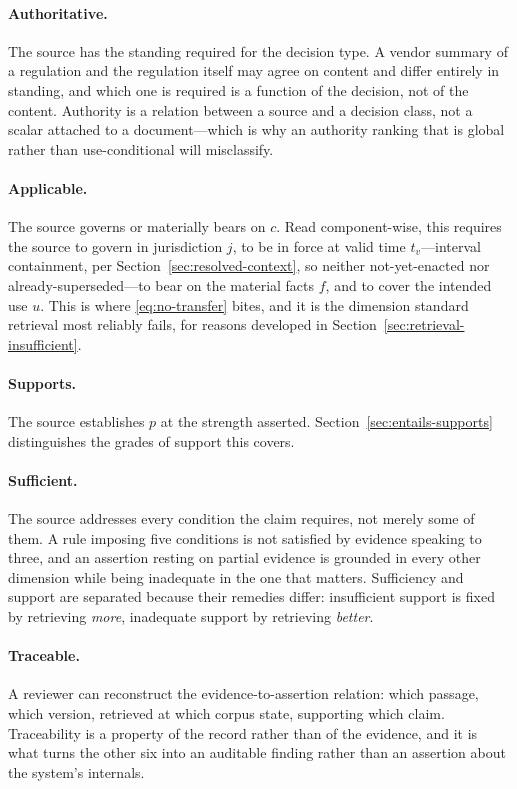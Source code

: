 \paragraph{Authoritative.} The source has the standing required for the decision
type. A vendor summary of a regulation and the regulation itself may agree on
content and differ entirely in standing, and which one is required is a function of
the decision, not of the content. Authority is a relation between a source and a
decision class, not a scalar attached to a document---which is why an authority
ranking that is global rather than use-conditional will misclassify.

\paragraph{Applicable.} The source governs or materially bears on $c$. Read
component-wise, this requires the source to govern in jurisdiction $j$, to be in force
at valid time $t_v$---interval containment, per
Section~\ref{sec:resolved-context}, so neither not-yet-enacted nor
already-superseded---to bear on the material facts $f$, and to cover the intended use
$u$. This is where \eqref{eq:no-transfer} bites, and it is the dimension standard
retrieval most reliably fails, for reasons developed in
Section~\ref{sec:retrieval-insufficient}.

\paragraph{Supports.} The source establishes $p$ at the strength asserted.
Section~\ref{sec:entails-supports} distinguishes the grades of support this covers.

\paragraph{Sufficient.} The source addresses every condition the claim requires,
not merely some of them. A rule imposing five conditions is not satisfied by evidence
speaking to three, and an assertion resting on partial evidence is grounded in every
other dimension while being inadequate in the one that matters. Sufficiency and
support are separated because their remedies differ: insufficient support is fixed by
retrieving \emph{more}, inadequate support by retrieving \emph{better}.

\paragraph{Traceable.} A reviewer can reconstruct the evidence-to-assertion
relation: which passage, which version, retrieved at which corpus state, supporting
which claim. Traceability is a property of the record rather than of the evidence, and
it is what turns the other six into an auditable finding rather than an assertion
about the system's internals.

